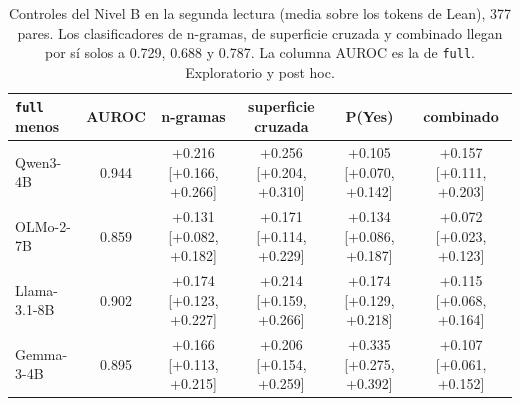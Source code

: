 \documentclass[10pt]{article}
\newcommand{\vr}[1]{\texttt{#1}}
\begin{document}
\begin{table}[h]
\centering
\caption{Controles del Nivel B en la segunda lectura (media sobre los tokens de Lean), 377 pares. Los clasificadores de n-gramas, de superficie cruzada y combinado llegan por sí solos a 0.729, 0.688 y 0.787. La columna AUROC es la de \vr{full}. Exploratorio y post hoc.}
\label{tab:bcontroles2}
\vspace{2pt}
{\footnotesize\setlength{\tabcolsep}{2pt}
\begin{tabular}{@{}lccccc@{}}
\toprule
\vr{full} menos & AUROC & n-gramas & superficie cruzada & P(Yes) & combinado\\
\midrule
Qwen3-4B     & 0.944 & +0.216 [+0.166, +0.266] & +0.256 [+0.204, +0.310] & +0.105 [+0.070, +0.142] & +0.157 [+0.111, +0.203]\\
OLMo-2-7B    & 0.859 & +0.131 [+0.082, +0.182] & +0.171 [+0.114, +0.229] & +0.134 [+0.086, +0.187] & +0.072 [+0.023, +0.123]\\
Llama-3.1-8B & 0.902 & +0.174 [+0.123, +0.227] & +0.214 [+0.159, +0.266] & +0.174 [+0.129, +0.218] & +0.115 [+0.068, +0.164]\\
Gemma-3-4B   & 0.895 & +0.166 [+0.113, +0.215] & +0.206 [+0.154, +0.259] & +0.335 [+0.275, +0.392] & +0.107 [+0.061, +0.152]\\
\bottomrule
\end{tabular}}
\end{table}
\end{document}
